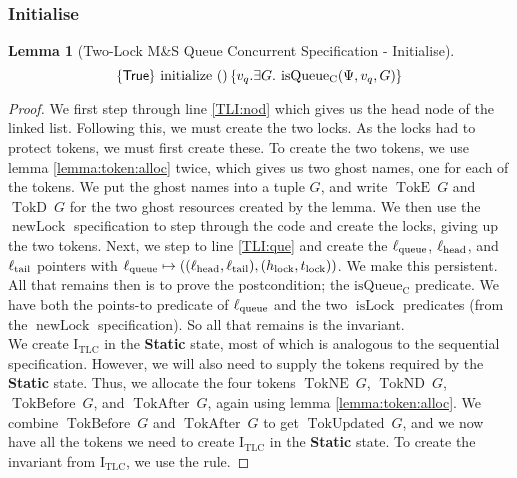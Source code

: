\documentclass[a4paper, 10pt]{report}
\theoremstyle{definition}
\newtheorem{lemma}[theorem]{Lemma}
\newcommand{\isLock}{\operatorname{isLock}}
\newcommand{\newLock}{\operatorname{newLock}}
\newcommand{\initialise}{\operatorname{initialize}}
\newcommand{\msq}{M\&S Queue}
\newcommand{\tlmsq}{Two-Lock \msq{}}
\newcommand{\isqueueconc}{\operatorname{isQueue_{C}}}
\newcommand{\TLQueueInvariantConc}{\operatorname{I_{TLC}}}
\newcommand{\vq}{v_q}
\newcommand{\locN}[1]{\loc_{\mathrm{#1}}}
\newcommand{\lochead}{\locN{head}}
\newcommand{\loctail}{\locN{tail}}
\newcommand{\locqueue}{\locN{queue}}
\newcommand{\Hlock}{h_{\mathrm{lock}}}
\newcommand{\Tlock}{t_{\mathrm{lock}}}
\newcommand{\StaticState}{\textbf{Static}\xspace}
\newcommand{\Qg}{G}
\newcommand{\TokE}[1]{\operatorname{TokE} ~ #1}
\newcommand{\TokEQg}{\TokE{\Qg}}
\newcommand{\TokNE}[1]{\operatorname{TokNE} ~ #1}
\newcommand{\TokNEQg}{\TokNE{\Qg}}
\newcommand{\TokD}[1]{\operatorname{TokD} ~ #1}
\newcommand{\TokDQg}{\TokD{\Qg}}
\newcommand{\TokND}[1]{\operatorname{TokND} ~ #1}
\newcommand{\TokNDQg}{\TokND{\Qg}}
\newcommand{\TokBefore}[1]{\operatorname{TokBefore} ~ #1}
\newcommand{\TokBeforeQg}{\TokBefore{\Qg}}
\newcommand{\TokAfter}[1]{\operatorname{TokAfter} ~ #1}
\newcommand{\TokAfterQg}{\TokAfter{\Qg}}
\newcommand{\TokUpdated}[1]{\operatorname{TokUpdated} ~ #1}
\newcommand{\TokUpdatedQg}{\TokUpdated{\Qg}}
\newcommand{\concspecinitHTGen}[3]{\hoare{\TRUE}{\initialise \ \TT}{#2 . \Exists #3. \isqueueconc(#1, #2, #3)}}
\newcommand{\concspecinitGen}[3]{\concspecinitHTGen{#1}{#2}{#3}}
\newcommand{\concspecinit}[1]{\concspecinitGen{#1}{\vq}{\Qg}}
\begin{document}
\subsubsection{Initialise}
\begin{lemma}[\tlmsq{} Concurrent Specification - Initialise]\label{TLMSQ:spec:conc:init}
  \begin{equation*}
    \concspecinit{\Psi}
  \end{equation*}
\end{lemma}
\begin{proof}
We first step through line \ref{TLI:nod} which gives us the head node of the linked list. Following this, we must create the two locks. As the locks had to protect tokens, we must first create these. To create the two tokens, we use lemma \ref{lemma:token:alloc} twice, which gives us two ghost names, one for each of the tokens. We put the ghost names into a tuple $\Qg$, and write $\TokEQg$ and $\TokDQg$ for the two ghost resources created by the lemma. We then use the $\newLock$ specification to step through the code and create the locks, giving up the two tokens. Next, we step to line \ref{TLI:que} and create the $\locqueue$, $\lochead$, and $\loctail$ pointers with $\locqueue \mapsto ((\lochead, \loctail), (\Hlock, \Tlock))$. We make this persistent.\\
All that remains then is to prove the postcondition; the $\isqueueconc$ predicate. We have both the points-to predicate of $\locqueue$ and the two $\isLock$ predicates (from the $\newLock$ specification). So all that remains is the invariant.\\
We create $\TLQueueInvariantConc$ in the \StaticState state, most of which is analogous to the sequential specification. However, we will also need to supply the tokens required by the \StaticState state. Thus, we allocate the four tokens $\TokNEQg$, $\TokNDQg$, $\TokBeforeQg$, and $\TokAfterQg$, again using lemma \ref{lemma:token:alloc}. We combine $\TokBeforeQg$ and $\TokAfterQg$ to get $\TokUpdatedQg$, and we now have all the tokens we need to create $\TLQueueInvariantConc$ in the \StaticState state. To create the invariant from $\TLQueueInvariantConc$, we use the  rule.
\end{proof}
\end{document}
